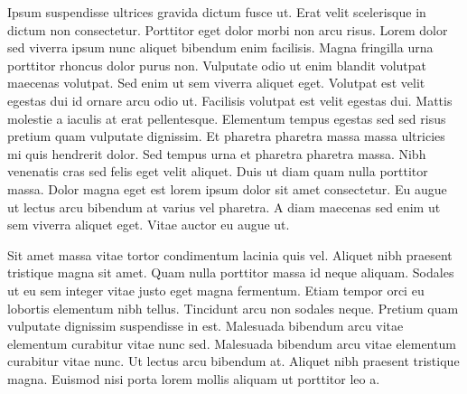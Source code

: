 \documentclass[12pt]{article}
\begin{document}
\begin{flushleft}
Ipsum suspendisse ultrices gravida dictum fusce ut. Erat velit scelerisque in dictum non consectetur. Porttitor eget dolor morbi non arcu risus. Lorem dolor sed viverra ipsum nunc aliquet bibendum enim facilisis. Magna fringilla urna porttitor rhoncus dolor purus non. Vulputate odio ut enim blandit volutpat maecenas volutpat. Sed enim ut sem viverra aliquet eget. Volutpat est velit egestas dui id ornare arcu odio ut. Facilisis volutpat est velit egestas dui. Mattis molestie a iaculis at erat pellentesque. Elementum tempus egestas sed sed risus pretium quam vulputate dignissim. Et pharetra pharetra massa massa ultricies mi quis hendrerit dolor. Sed tempus urna et pharetra pharetra massa. Nibh venenatis cras sed felis eget velit aliquet. Duis ut diam quam nulla porttitor massa. Dolor magna eget est lorem ipsum dolor sit amet consectetur. Eu augue ut lectus arcu bibendum at varius vel pharetra. A diam maecenas sed enim ut sem viverra aliquet eget. Vitae auctor eu augue ut.

Sit amet massa vitae tortor condimentum lacinia quis vel. Aliquet nibh praesent tristique magna sit amet. Quam nulla porttitor massa id neque aliquam. Sodales ut eu sem integer vitae justo eget magna fermentum. Etiam tempor orci eu lobortis elementum nibh tellus. Tincidunt arcu non sodales neque. Pretium quam vulputate dignissim suspendisse in est. Malesuada bibendum arcu vitae elementum curabitur vitae nunc sed. Malesuada bibendum arcu vitae elementum curabitur vitae nunc. Ut lectus arcu bibendum at. Aliquet nibh praesent tristique magna. Euismod nisi porta lorem mollis aliquam ut porttitor leo a.

\end{flushleft}
\end{document}
